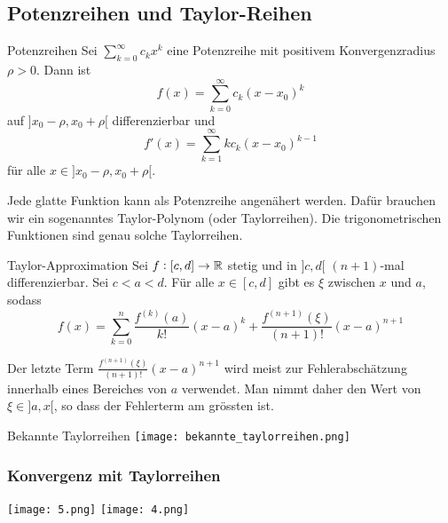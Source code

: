 \subsection{Potenzreihen und Taylor-Reihen}

\begin{theorem}{Potenzreihen}
	Sei $\sum_{k=0}^\infty c_k x^k$ eine Potenzreihe mit positivem Konvergenzradius $\rho > 0$. Dann ist
    $$f(x) = \sum_{k=0}^\infty c_k (x-x_0)^k$$
    auf $]x_0 - \rho, x_0 + \rho[$ differenzierbar und
    $$f'(x) = \sum_{k=1}^\infty k c_k (x - x_0)^{k-1}$$
    für alle $x \in ]x_0 - \rho, x_0 + \rho[$.
\end{theorem}

\begin{remark}
    Jede glatte Funktion kann als Potenzreihe angenähert werden. Dafür brauchen wir ein sogenanntes Taylor-Polynom (oder Taylorreihen). Die trigonometrischen Funktionen sind genau solche Taylorreihen.
\end{remark}

\begin{theorem}[important]{Taylor-Approximation}
	Sei $f: [c,d] \to \mathbb{R}$ stetig und in $]c,d[$ $(n+1)$-mal differenzierbar.
	Sei $c<a<d$.
	Für alle $x \in [c,d]$ gibt es $\xi$ zwischen $x$ und $a$, sodass
	\begin{equation*}
		f(x) = \sum_{k=0}^n \frac{f^{(k)} (a)}{k!} (x - a)^k + \frac{f^{(n+1)} (\xi)}{(n+1)!} (x - a)^{n+1}
	\end{equation*}
\end{theorem}

\begin{remark}
    Der letzte Term $\frac{f^{(n+1)} (\xi)}{(n+1)!} (x - a)^{n+1}$ wird meist zur Fehlerabschätzung innerhalb eines Bereiches von $a$ verwendet. Man nimmt daher den Wert von $\xi \in ]a, x[$, so dass der Fehlerterm am grössten ist.
\end{remark}

\begin{corollary}{Bekannte Taylorreihen}
    \texttt{[image: bekannte\_taylorreihen.png]}
\end{corollary}

\subsubsection{Konvergenz mit Taylorreihen}

\begin{center}
\texttt{[image: 5.png]}
\texttt{[image: 4.png]}
\end{center}
